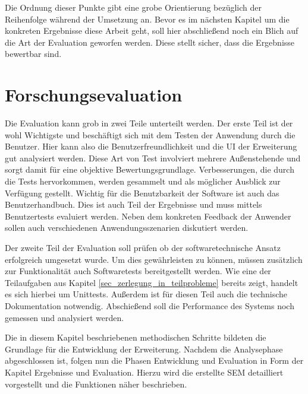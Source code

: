 Die Ordnung dieser Punkte gibt eine grobe Orientierung bezüglich der Reihenfolge
während der Umsetzung an. Bevor es im nächsten Kapitel um die konkreten Ergebnisse
diese Arbeit geht, soll hier abschließend noch ein Blich auf die Art der
Evaluation geworfen werden. Diese stellt sicher, dass die Ergebnisse bewertbar
sind.

\section{Forschungsevaluation}
Die Evaluation kann grob in zwei Teile unterteilt werden. Der erste Teil ist der
wohl Wichtigste und beschäftigt sich mit dem Testen der Anwendung durch die Benutzer.
Hier kann also die Benutzerfreundlichkeit und die \ac{UI} der Erweiterung gut analysiert
werden. Diese Art von Test involviert mehrere Außenstehende und sorgt damit für
eine objektive Bewertungsgrundlage. Verbesserungen, die durch die Tests
hervorkommen, werden gesammelt und als möglicher Ausblick zur Verfügung gestellt.
Wichtig für die Benutzbarkeit der Software ist auch das Benutzerhandbuch. Dies ist
auch Teil der Ergebnisse und muss mittels Benutzertests evaluiert werden. Neben
dem konkreten Feedback der Anwender sollen auch verschiedenen
Anwendungsszenarien diskutiert werden.

Der zweite Teil der Evaluation soll prüfen ob der softwaretechnische Ansatz
erfolgreich umgesetzt wurde. Um dies gewährleisten zu können, müssen zusätzlich
zur Funktionalität auch Softwaretests bereitgestellt werden. Wie eine der Teilaufgaben
aus Kapitel \ref{sec_zerlegung_in_teilprobleme} bereits zeigt, handelt es sich
hierbei um Unittests. Außerdem ist für diesen Teil auch die technische Dokumentation
notwendig. Abschießend soll die Performance des Systems noch gemessen und
analysiert werden.

Die in diesem Kapitel beschriebenen methodischen Schritte bildeten die Grundlage
für die Entwicklung der Erweiterung. Nachdem die Analysephase abgeschlossen ist,
folgen nun die Phasen Entwicklung und Evaluation in Form der Kapitel Ergebnisse
und Evaluation. Hierzu wird die erstellte \ac{SEM} detailliert vorgestellt und
die Funktionen näher beschrieben.
